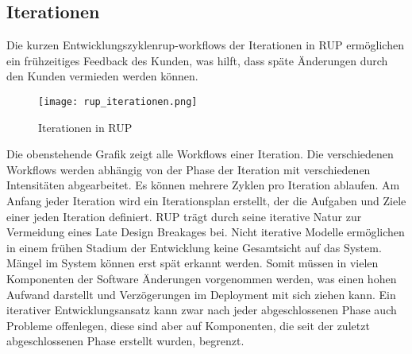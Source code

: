 \subsection{Iterationen}
Die kurzen Entwicklungszyklen{rup-workflows} der Iterationen in RUP ermöglichen ein frühzeitiges Feedback des Kunden, was hilft, dass späte Änderungen durch den Kunden vermieden werden können. 
\begin{center}
\begin{figure}[h]
	\centering
	\texttt{[image: rup\_iterationen.png]}
	\caption{Iterationen in RUP}
\end{figure}
\end{center}
Die obenstehende Grafik zeigt alle Workflows einer Iteration. Die verschiedenen Workflows werden abhängig von der Phase der Iteration mit verschiedenen Intensitäten abgearbeitet. 
Es können mehrere Zyklen pro Iteration ablaufen.
Am Anfang jeder Iteration wird ein Iterationsplan erstellt, der die Aufgaben und Ziele einer jeden Iteration definiert. 
RUP trägt durch seine iterative Natur zur Vermeidung eines Late Design Breakages bei. Nicht iterative Modelle ermöglichen in einem frühen Stadium der Entwicklung keine Gesamtsicht auf das System. Mängel im System können erst spät erkannt werden. Somit müssen in vielen Komponenten der Software Änderungen vorgenommen werden, was einen hohen Aufwand darstellt und Verzögerungen im Deployment mit sich ziehen kann. 
Ein iterativer Entwicklungsansatz kann zwar nach jeder abgeschlossenen Phase auch Probleme offenlegen, diese sind aber auf Komponenten, die seit der zuletzt abgeschlossenen Phase erstellt wurden, begrenzt.
